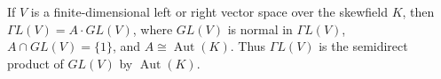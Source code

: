 If $V$ is a finite-dimensional left or right vector space over the skewfield $K$, then $\Gamma L(V) = A \cdot GL(V)$, where $GL(V)$ is normal in $\Gamma L(V)$, $A \cap GL(V) = \{1\}$, and $A \cong \operatorname{Aut}(K)$. Thus $\Gamma L(V)$ is the semidirect product of $GL(V)$ by $\operatorname{Aut}(K)$.
